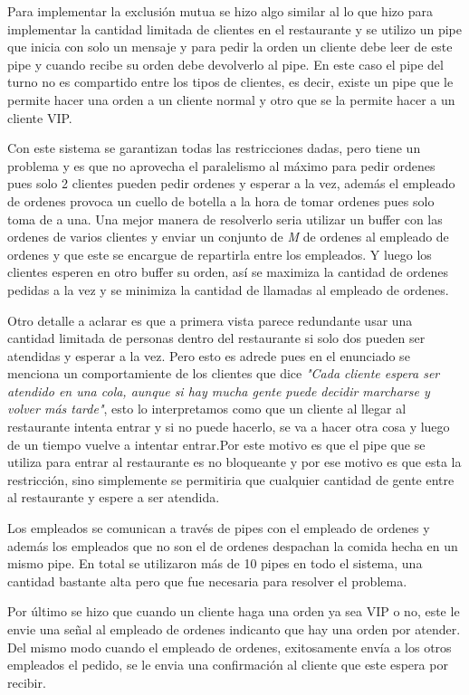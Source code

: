 \documentclass[11pt]{article} %
\begin{document}
    Para implementar la exclusión mutua se hizo algo similar al lo que hizo para implementar la cantidad limitada de clientes en el restaurante y se utilizo un pipe que inicia con solo un mensaje y para pedir la orden un cliente debe leer de este pipe y cuando recibe su orden debe devolverlo al pipe. En este caso el pipe del turno no es compartido entre los tipos de clientes, es decir, existe un pipe que le permite hacer una orden a un cliente normal y otro que se la permite hacer a un cliente VIP.

    Con este sistema se garantizan todas las restricciones dadas, pero tiene un problema y es que no aprovecha el paralelismo al máximo para pedir ordenes pues solo 2 clientes pueden pedir ordenes y esperar a la vez, además el empleado de ordenes provoca un cuello de botella a la hora de tomar ordenes pues solo toma de a una. Una mejor manera de resolverlo seria utilizar un buffer con las ordenes de varios clientes y enviar un conjunto de \textit{M} de ordenes al empleado de ordenes y que este se encargue de repartirla entre los empleados. Y luego los clientes esperen en otro buffer su orden, así se maximiza la cantidad de ordenes pedidas a la vez y se minimiza la cantidad de llamadas al empleado de ordenes.

    Otro detalle a aclarar es que a primera vista parece redundante usar una cantidad limitada de personas dentro del restaurante si solo dos pueden ser atendidas y esperar a la vez. Pero esto es adrede pues en el enunciado se menciona un comportamiente de los clientes que dice \textit{"Cada cliente espera ser atendido en una cola, aunque si hay mucha gente puede decidir marcharse y volver más tarde"}, esto lo interpretamos como que un cliente al llegar al restaurante intenta entrar y si no puede hacerlo, se va a hacer otra cosa y luego de un tiempo vuelve a intentar entrar.Por este motivo es que el pipe que se utiliza para entrar al restaurante es no bloqueante y por ese motivo es que esta la restricción, sino simplemente se permitiria que cualquier cantidad de gente entre al restaurante y espere a ser atendida.

    Los empleados se comunican a través de pipes con el empleado de ordenes y además los empleados que no son el de ordenes despachan la comida hecha en un mismo pipe. En total se utilizaron más de 10 pipes en todo el sistema, una cantidad bastante alta pero que fue necesaria para resolver el problema.

    Por último se hizo que cuando un cliente haga una orden ya sea VIP o no, este le envie una señal al empleado de ordenes indicanto que hay una orden por atender. Del mismo modo cuando el empleado de ordenes, exitosamente envía a los otros empleados el pedido, se le envia una confirmación al cliente que este espera por recibir.
\end{document}
